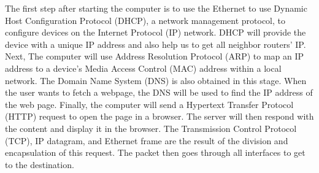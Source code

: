 \documentclass[11pt]{article}
\begin{document}
\begin{enumerate}
		The first step after starting the computer is to use the Ethernet to use Dynamic Host Configuration Protocol (DHCP), a network management protocol, to configure devices on the Internet Protocol (IP) network. DHCP will provide the device with a unique IP address and also help us to get all neighbor routers' IP. Next, The computer will use Address Resolution Protocol (ARP) to map an IP address to a device's Media Access Control (MAC) address within a local network. The Domain Name System (DNS) is also obtained in this stage. When the user wants to fetch a webpage, the DNS will be used to find the IP address of the web page. Finally, the computer will send a Hypertext Transfer Protocol (HTTP) request to open the page in a browser. The server will then respond with the content and display it in the browser. The Transmission Control Protocol (TCP), IP datagram, and Ethernet frame are the result of the division and encapsulation of this request. The packet then goes through all interfaces to get to the destination.\\
	\end{enumerate}
\end{document}

